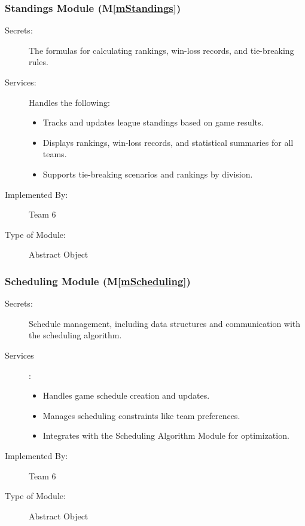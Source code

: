 \documentclass[12pt, titlepage]{article}
\newcommand{\mref}[1]{M\ref{#1}}
\begin{document}
\subsubsection{Standings Module (\mref{mStandings})}

\begin{description}
  \item[Secrets:] The formulas for calculating rankings, win-loss records, and tie-breaking rules.
  
  \item[Services:] Handles the following:
    \begin{itemize}
      \item Tracks and updates league standings based on game results.
      \item Displays rankings, win-loss records, and statistical summaries for all teams.
      \item Supports tie-breaking scenarios and rankings by division.
    \end{itemize}
  
  \item[Implemented By:] Team 6
  
  \item[Type of Module:] Abstract Object
  \end{description}

  \subsubsection{Scheduling Module (\mref{mScheduling})}

  \begin{description}
    \item[Secrets:] Schedule management, including data structures and communication with the scheduling algorithm.
    
    \item[Services]: 
      \begin{itemize}
        \item Handles game schedule creation and updates.
        \item Manages scheduling constraints like team preferences.
        \item Integrates with the Scheduling Algorithm Module for optimization.
      \end{itemize}
    \item[Implemented By:] Team 6
    \item[Type of Module:] Abstract Object
    \end{description}
\end{document}
